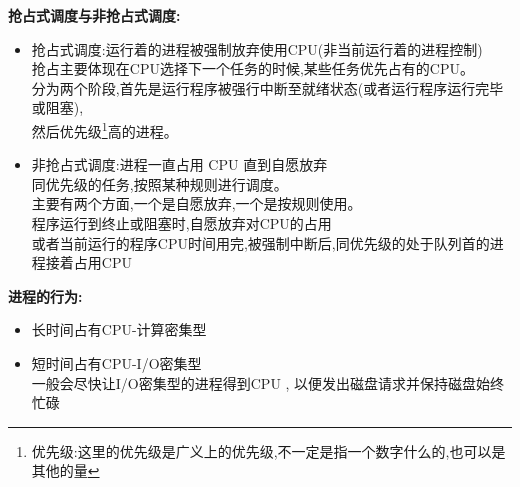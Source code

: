 \documentclass[UTF8,a4paper]{ctexart}
\newcommand{\spaceline}{\vspace{\baselineskip}}
\begin{document}
\textbf{抢占式调度与非抢占式调度:}
\begin{itemize}
	\item 抢占式调度:运行着的进程被强制放弃使用CPU(非当前运行着的进程控制)\\
	      抢占主要体现在CPU选择下一个任务的时候,某些任务优先占有的CPU。\\
	      分为两个阶段,首先是运行程序被强行中断至就绪状态(或者运行程序运行完毕或阻塞),\\
	      然后优先级\footnote{优先级:这里的优先级是广义上的优先级,不一定是指一个数字什么的,也可以是其他的量}高的进程。

	\item 非抢占式调度:进程一直占用 CPU 直到自愿放弃\\
	      同优先级的任务,按照某种规则进行调度。\\
	      主要有两个方面,一个是自愿放弃,一个是按规则使用。\\
	      程序运行到终止或阻塞时,自愿放弃对CPU的占用\\
	      或者当前运行的程序CPU时间用完,被强制中断后,同优先级的处于队列首的进程接着占用CPU
\end{itemize}

\spaceline
\textbf{进程的行为:}
\begin{itemize}
	\item 长时间占有CPU-计算密集型
	\item 短时间占有CPU-I/O密集型 \\
	      一般会尽快让I/O密集型的进程得到CPU , 以便发出磁盘请求并保持磁盘始终忙碌
\end{itemize}
\end{document}
